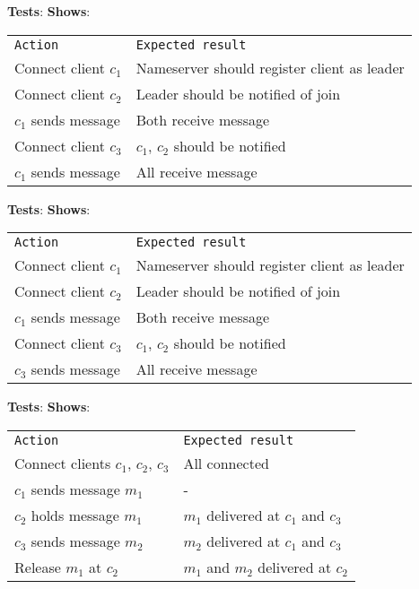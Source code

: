 
	\textbf{Tests}:
	\textbf{Shows}:

	\begin{tabular}{ll}
		\texttt{Action} & \texttt{Expected result} \\
		Connect client $c_1$ & Nameserver should register client as leader \\
		Connect client $c_2$ & Leader should be notified of join \\
		$c_1$ sends message & Both receive message \\
		Connect client $c_3$ & $c_1$, $c_2$ should be notified \\
		$c_1$ sends message & All receive message \\
	\end{tabular}

	\textbf{Tests}:
	\textbf{Shows}:

	\begin{tabular}{ll}
		\texttt{Action} & \texttt{Expected result} \\
		Connect client $c_1$ & Nameserver should register client as leader \\
		Connect client $c_2$ & Leader should be notified of join \\
		$c_1$ sends message & Both receive message \\
		Connect client $c_3$ & $c_1$, $c_2$ should be notified \\
		$c_3$ sends message & All receive message \\
	\end{tabular}
	\textbf{Tests}:
	\textbf{Shows}:

	\begin{tabular}{ll}
		\texttt{Action} & \texttt{Expected result} \\
		Connect clients $c_1$, $c_2$, $c_3$ & All connected\\
		$c_1$ sends message $m_1$ & -\\
		$c_2$ holds message $m_1$ & $m_1$ delivered at $c_1$ and $c_3$ \\
		$c_3$ sends message $m_2$ & $m_2$ delivered at $c_1$ and $c_3$ \\
		Release $m_1$ at $c_2$ & $m_1$ and $m_2$ delivered at $c_2$ \\
	\end{tabular}

